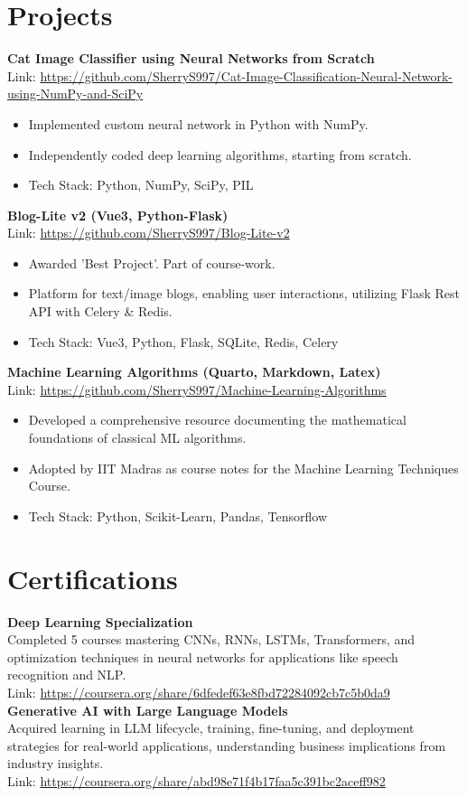 \documentclass[a4paper,10pt]{article}
\begin{document}
\section*{Projects}
\textbf{Cat Image Classifier using Neural Networks from Scratch} \\
Link: \url{https://github.com/SherryS997/Cat-Image-Classification-Neural-Network-using-NumPy-and-SciPy}
\begin{itemize}[noitemsep]
    \item Implemented custom neural network in Python with NumPy.
    \item Independently coded deep learning algorithms, starting from scratch.
    \item Tech Stack: Python, NumPy, SciPy, PIL
\end{itemize}
\textbf{Blog-Lite v2 (Vue3, Python-Flask)} \\
Link: \url{https://github.com/SherryS997/Blog-Lite-v2}
\begin{itemize}[noitemsep]
    \item Awarded 'Best Project'. Part of course-work.
    \item Platform for text/image blogs, enabling user interactions, utilizing Flask Rest API with Celery \& Redis.
    \item Tech Stack: Vue3, Python, Flask, SQLite, Redis, Celery
\end{itemize}
\textbf{Machine Learning Algorithms (Quarto, Markdown, Latex)} \\
Link: \url{https://github.com/SherryS997/Machine-Learning-Algorithms}
\begin{itemize}[noitemsep]
    \item Developed a comprehensive resource documenting the mathematical foundations of classical ML algorithms.
    \item Adopted by IIT Madras as course notes for the Machine Learning Techniques Course.
    \item Tech Stack: Python, Scikit-Learn, Pandas, Tensorflow
\end{itemize}

\section*{Certifications}
\textbf{Deep Learning Specialization} \\
Completed 5 courses mastering CNNs, RNNs, LSTMs, Transformers, and optimization techniques in neural networks for applications like speech recognition and NLP. \\
Link: \url{https://coursera.org/share/6dfedef63e8fbd72284092cb7c5b0da9}\\
\textbf{Generative AI with Large Language Models} \\
Acquired learning in LLM lifecycle, training, fine-tuning, and deployment strategies for real-world applications, understanding business implications from industry insights. \\
Link: \url{https://coursera.org/share/abd98e71f4b17faa5c391bc2aceff982}
\end{document}
